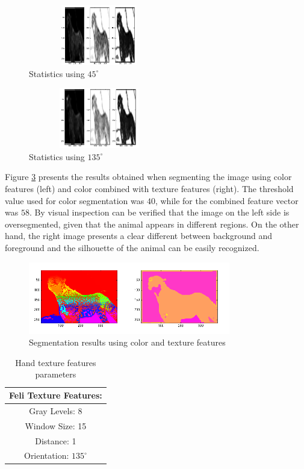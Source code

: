 \documentclass{IEEEtran}
\begin{document}
\begin{figure}[h!] 
 \centering
 \includegraphics[width=175pt,height=75pt]{./fig/feli/fstats_135_n1_1.png}%
 \caption{Statistics using $45^{\circ}$}
 \label{fig:feli_45}
\end{figure}

\begin{figure}[h!] 
 \centering
 \includegraphics[width=175pt,height=75pt]{./fig/feli/fstats_135_n1_n1.png}%
 \caption{Statistics using $135^{\circ}$}
 \label{fig:feli_135}
\end{figure}

Figure \ref{fig:feli_seg} presents the results obtained when segmenting the image using color features (left) and color combined with texture features (right). The threshold value used for color segmentation was $40$, while for the combined feature vector was $58$. By visual inspection can be verified that the image on the left side is oversegmented, given that the animal appears in different regions. On the other hand, the right image presents a clear different between background and foreground and the silhouette of the animal can be easily recognized.

\begin{figure}[h!] 
 \centering
 \includegraphics[width=250pt]{./fig/feli/fres_all_58.png}%
 \caption{Segmentation results using color and texture features}
 \label{fig:feli_seg}
\end{figure}

\begin{table}[h!] 
\centering
\begin{tabular}{|c|}
\hline
Feli Texture Features:\\
\hline
  Gray Levels:   8\\
  Window Size: 15\\
  Distance:   1 \\
  Orientation: $135^{\circ}$\\
\hline
\end{tabular}
\caption{Hand texture features parameters}
\label{tb:param_feli}
\end{table}
\end{document}
